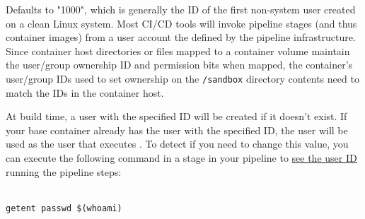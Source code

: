 
Defaults to "1000", which is generally the ID of the first non-system user created on a clean
Linux system.  Most CI/CD tools will invoke pipeline stages (and thus container images) from
a user account the defined by the pipeline infrastructure.  Since container host directories or files
mapped to a container volume maintain the user/group ownership ID and permission bits when mapped, 
the container's user/group IDs used to set ownership on the \texttt{/sandbox} directory contents
need to match the IDs in the container host.

At build time, a user with the specified ID will be created if it doesn't exist.  If your base 
container already has the user with the specified ID, the user will be used as the user that 
executes \scaresolver. To detect if you need to change this value, you can execute the following 
command in a stage in your pipeline to 
\href{https://www.cyberciti.biz/faq/understanding-etcpasswd-file-format/}{see the user ID}
running the pipeline steps:


\noindent\\\texttt{getent passwd \$(whoami)}

